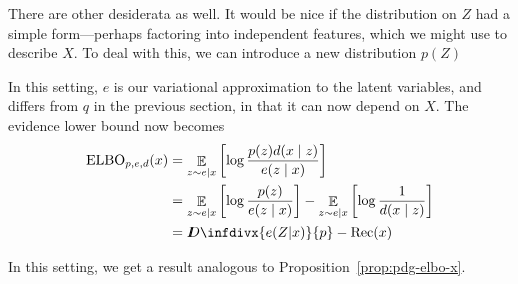 \documentclass{article}
\theoremstyle{plain}
\theoremstyle{definition}
\DeclareMathOperator*{\Ex}{\mathbb{E}} %
\newcommand{\thickD}{I\mkern-8muD}
\newcommand{\kldiv}{\thickD\infdivx}
\begin{document}

There are other desiderata as well. It would be nice if the distribution on $Z$ had a simple form---perhaps factoring into independent features, which we might use to describe $X$. To deal with this, we can introduce a new distribution $p(Z)$

In this setting, $e$ is our variational approximation to the latent variables, and differs from $q$ in the previous section, in that it can now depend on $X$. The evidence lower bound now becomes
\begin{align*}
	\mathrm{ELBO}_{p,e,d}(x) &= \Ex_{z \sim e|x} \left[\log \frac{p(z) d(x\mid z)}{e(z\mid x)} \right] \\
		&= \Ex_{z \sim e|x}\left[ \log \frac{p(z)}{e(z\mid x)}  \right] - \Ex_{z \sim e|x} \left[\log \frac1{d(x\mid z)} \right] \\
		&= \kldiv{e(Z|x)}{p} - \mathrm{Rec}(x)
\end{align*}

In this setting, we get a result analogous to Proposition~\ref{prop:pdg-elbo-x}.
\end{document}

